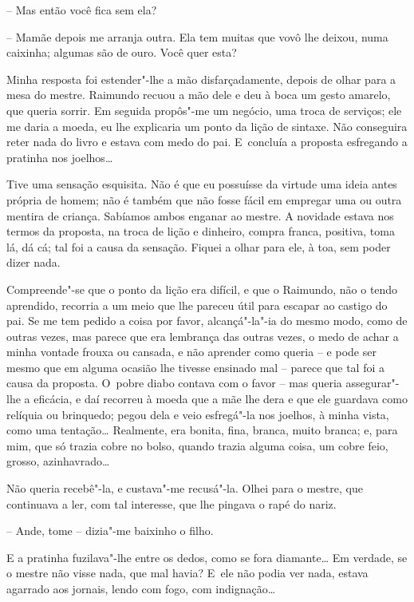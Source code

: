 -- Mas então você fica sem ela?

-- Mamãe depois me arranja outra. Ela tem muitas que vovô lhe deixou,
numa caixinha; algumas são de ouro. Você quer esta?

Minha resposta foi estender"-lhe a mão disfarçadamente, depois de olhar
para a mesa do mestre. Raimundo recuou a mão dele e deu à boca um gesto
amarelo, que queria sorrir. Em seguida propôs"-me um negócio, uma troca
de serviços; ele me daria a moeda, eu lhe explicaria um ponto da lição
de sintaxe. Não conseguira reter nada do livro e estava com medo do pai.
E~concluía a proposta esfregando a pratinha nos joelhos\ldots{}

Tive uma sensação esquisita. Não é que eu possuísse da virtude uma ideia
antes própria de homem; não é também que não fosse fácil em empregar uma
ou outra mentira de criança. Sabíamos ambos enganar ao mestre. A
novidade estava nos termos da proposta, na troca de lição e dinheiro,
compra franca, positiva, toma lá, dá cá; tal foi a causa da sensação.
Fiquei a olhar para ele, à toa, sem poder dizer nada.

Compreende"-se que o ponto da lição era difícil, e que o Raimundo, não o
tendo aprendido, recorria a um meio que lhe pareceu útil para escapar ao
castigo do pai. Se me tem pedido a coisa por favor, alcançá"-la"-ia do
mesmo modo, como de outras vezes, mas parece que era lembrança das
outras vezes, o medo de achar a minha vontade frouxa ou cansada, e não
aprender como queria -- e pode ser mesmo que em alguma ocasião lhe
tivesse ensinado mal -- parece que tal foi a causa da proposta. O~pobre
diabo contava com o favor -- mas queria assegurar"-lhe a eficácia, e daí
recorreu à moeda que a mãe lhe dera e que ele guardava como relíquia ou
brinquedo; pegou dela e veio esfregá"-la nos joelhos, à minha vista, como
uma tentação\ldots{} Realmente, era bonita, fina, branca, muito branca; e,
para mim, que só trazia cobre no bolso, quando trazia alguma coisa, um
cobre feio, grosso, azinhavrado\ldots{}

Não queria recebê"-la, e custava"-me recusá"-la. Olhei para o mestre, que
continuava a ler, com tal interesse, que lhe pingava o rapé do nariz.

-- Ande, tome -- dizia"-me baixinho o filho.

E a pratinha fuzilava"-lhe entre os dedos, como se fora diamante\ldots{} Em
verdade, se o mestre não visse nada, que mal havia? E~ele não podia ver
nada, estava agarrado aos jornais, lendo com fogo, com indignação\ldots{}

